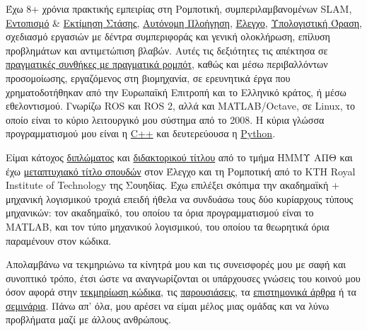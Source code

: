 \documentclass[a4paper,10pt,twoside]{article}
\begin{document}
\vspace{-0.5cm}
\begin{bw_box} \small
  \hspace{1em} Έχω 8+ χρόνια πρακτικής εμπειρίας στη Ρομποτική,
  συμπεριλαμβανομένων SLAM, \href{https://github.com/cbgl/cbgl}{Εντοπισμό} \&
  \href{https://github.com/fourier-scan-matcher/fsm-lo}{Εκτίμηση Στάσης},
  \href{https://link.springer.com/article/10.1007/s10846-019-01086-y}{Αυτόνομη
  Πλοήγηση},
  \href{https://www.tandfonline.com/doi/full/10.1080/00207179.2018.1514129}{Έλεγχο},
  \href{https://github.com/li9i/pandora\_vision\_2014}{Υπολογιστική Όραση},
  σχεδιασμό εργασιών με δέντρα συμπεριφοράς και
  γενική ολοκλήρωση, επίλυση προβλημάτων και αντιμετώπιση βλαβών.  Αυτές τις
  δεξιότητες τις απέκτησα σε
  \href{https://relief.web.auth.gr/\%CF\%81\%CE\%BF\%CE\%BC\%CF\%80\%CE\%BF\%CF\%84\%CE\%B9\%CE\%BA\%CE\%AC-\%CE\%BF\%CF\%87\%CE\%AE\%CE\%BC\%CE\%B1\%CF\%84\%CE\%B1/}{πραγματικές
  συνθήκες με πραγματικά ρομπότ}, καθώς και μέσω περιβαλλόντων προσομοίωσης,
  εργαζόμενος στη βιομηχανία, σε ερευνητικά έργα που χρηματοδοτήθηκαν από την Ευρωπαϊκή
  Επιτροπή και το Ελληνικό κράτος, ή μέσω εθελοντισμού. Γνωρίζω ROS και ROS 2,
  αλλά και MATLAB/Octave, σε Linux, το οποίο είναι το κύριο λειτουργικό μου
  σύστημα από το 2008. Η κύρια γλώσσα προγραμματισμού μου είναι η
  \href{https://github.com/fourier-scan-matcher/fsm}{C++} και δευτερεύουσα η
  \href{https://github.com/cultureid-auth-ros-packages/cultureid-waypoints-following}{Python}.

  \hspace{1em} Είμαι κάτοχος
  \href{https://ikee.lib.auth.gr/record/291560}{διπλώματος} και
  \href{https://www.didaktorika.gr/eadd/handle/10442/56399?locale=el}{διδακτορικού τίτλου} από το
  τμήμα ΗΜΜΥ ΑΠΘ και έχω
  \href{http://kth.diva-portal.org/smash/record.jsf?pid=diva2\%3A1102597\&dswid=2875}{μεταπτυχιακό
  τίτλο σπουδών} στον Έλεγχο και τη Ρομποτική από το KTH Royal Institute of
  Technology της Σουηδίας. Έχω επιλέξει σκόπιμα την ακαδημαϊκή + μηχανική
  λογισμικού τροχιά επειδή ήθελα να συνδυάσω τους δύο κυρίαρχους τύπους
  μηχανικών: τον ακαδημαϊκό, του οποίου τα όρια προγραμματισμού είναι το
  MATLAB, και τον τύπο μηχανικού λογισμικού, του οποίου τα θεωρητικά όρια
  παραμένουν στον κώδικα.

  \hspace{1em} Απολαμβάνω να τεκμηριώνω τα κίνητρά μου και τις συνεισφορές μου
  με σαφή και συνοπτικό τρόπο, έτσι ώστε να αναγνωρίζονται οι υπάρχουσες
  γνώσεις του κοινού μου όσον αφορά στην
  \href{https://github.com/li9i/pandora_vision_2014/blob/hydro-devel/pandora_vision_hole_detector/src/hole_fusion_node/hole_fusion.cpp}{τεκμηρίωση
  κώδικα}, τις
  \href{https://www.youtube.com/watch?v=xaDKjI0WkDc}{παρουσιάσεις}, τα
  \href{https://ieeexplore.ieee.org/abstract/document/9981228}{επιστημονικά
  άρθρα} ή τα
  \href{https://github.com/li9i/ros1_humble_bridge_template}{σεμινάρια}. Πάνω
  απ' όλα, μου αρέσει να είμαι μέλος μιας ομάδας και να λύνω προβλήματα μαζί με
  άλλους ανθρώπους.
\end{bw_box}
\vfill
\end{document}
